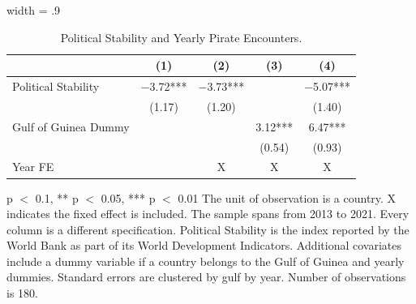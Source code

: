 \begin{table}

\caption{Political Stability and Yearly Pirate Encounters. \label{tab:first-stage}}
\centering
\begin{adjustbox}{width = .9\textwidth}
\begin{threeparttable}
\begin{tabular}[t]{l@{\hskip 60pt}cccc}
\toprule
  & (1) & (2) & (3) & (4)\\
\midrule
Political Stability & \num{-3.72}*** & \num{-3.73}*** &  & \num{-5.07}***\\
 & (\num{1.17}) & (\num{1.20}) &  & (\num{1.40})\\
Gulf of Guinea Dummy &  &  & \num{3.12}*** & \num{6.47}***\\
 &  &  & (\num{0.54}) & (\num{0.93})\\
Year FE &  & X & X & X\\
\bottomrule
\end{tabular}
\begin{tablenotes}
\item \scriptsize * p $<$ 0.1, ** p $<$ 0.05, *** p $<$ 0.01 The unit of observation is a country.  X indicates the fixed effect is included.
                   The sample spans from 2013 to 2021. Every column is a different specification. 
                   Political Stability is the index reported by the World Bank as part of its World Development Indicators.  
                   Additional covariates include a dummy variable if a country belongs to the Gulf of Guinea and yearly dummies.
                   Standard errors are clustered by gulf by year. Number of observations is 180.
\end{tablenotes}
\end{threeparttable}
\end{adjustbox}
\end{table}
